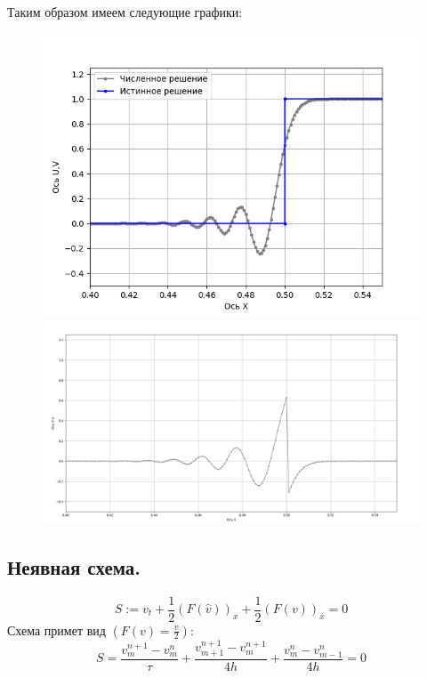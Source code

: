 \documentclass[a4paper,12pt]{article}
\begin{document}
Таким образом имеем следующие графики:
\begin{figure}[h]
    \begin{center}
    \begin{minipage}[h]{0.42\linewidth}
    \includegraphics[width=1\linewidth]{Figure_1.png}
    \end{minipage}
    \hfill
    \begin{minipage}[h]{0.57\linewidth}
    \includegraphics[width=1\linewidth]{Figure_2.png}
    \end{minipage}
    \hfill
    \end{center}
\end{figure}

\subsection{Неявная схема.}
\[
   S:=v_t+\frac12 (F(\hat{v}))_x+\frac12 (F(v))_\overline{x}=0 
\]
Схема примет вид $(F(v)=\frac{v}{2})$:
\[
S=\frac{v^{n+1}_m-v^n_m}{\tau}+\frac{v^{n+1}_{m+1}-v^{n+1}_m}{4h}+\frac{v^n_m-v^n_{m-1}}{4h}=0
\]
\end{document}
